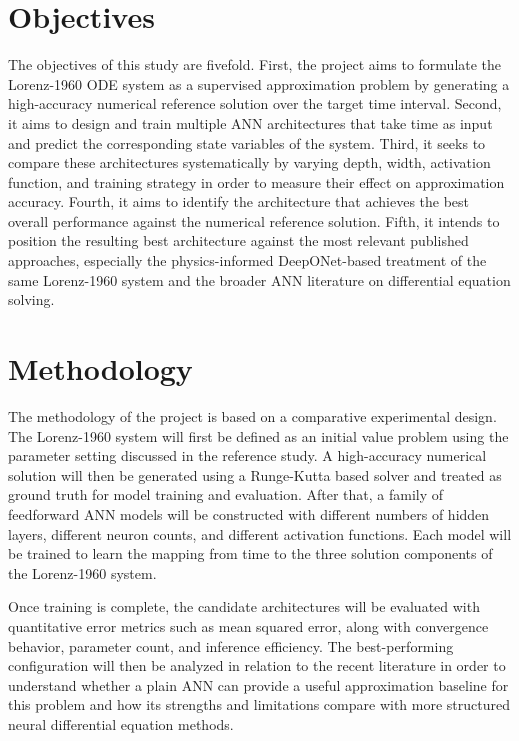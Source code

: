 \section{Objectives}
The objectives of this study are fivefold. First, the project aims to formulate the Lorenz-1960 ODE system as a supervised approximation problem by generating a high-accuracy numerical reference solution over the target time interval. Second, it aims to design and train multiple ANN architectures that take time as input and predict the corresponding state variables of the system. Third, it seeks to compare these architectures systematically by varying depth, width, activation function, and training strategy in order to measure their effect on approximation accuracy. Fourth, it aims to identify the architecture that achieves the best overall performance against the numerical reference solution. Fifth, it intends to position the resulting best architecture against the most relevant published approaches, especially the physics-informed DeepONet-based treatment of the same Lorenz-1960 system and the broader ANN literature on differential equation solving.

\section{Methodology}
The methodology of the project is based on a comparative experimental design. The Lorenz-1960 system will first be defined as an initial value problem using the parameter setting discussed in the reference study. A high-accuracy numerical solution will then be generated using a Runge-Kutta based solver and treated as ground truth for model training and evaluation. After that, a family of feedforward ANN models will be constructed with different numbers of hidden layers, different neuron counts, and different activation functions. Each model will be trained to learn the mapping from time to the three solution components of the Lorenz-1960 system.

Once training is complete, the candidate architectures will be evaluated with quantitative error metrics such as mean squared error, along with convergence behavior, parameter count, and inference efficiency. The best-performing configuration will then be analyzed in relation to the recent literature in order to understand whether a plain ANN can provide a useful approximation baseline for this problem and how its strengths and limitations compare with more structured neural differential equation methods.

